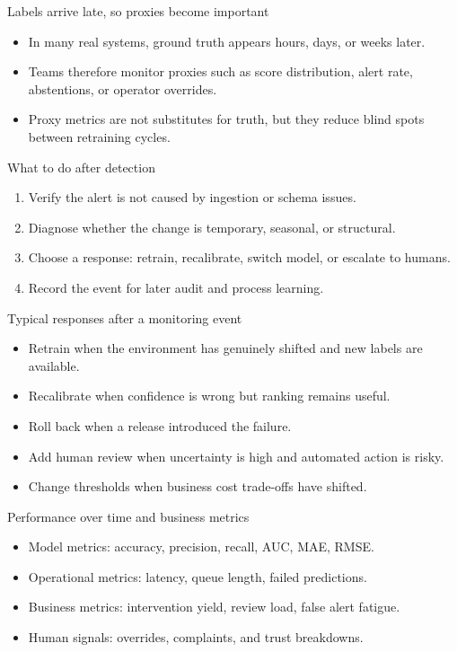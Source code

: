 \begin{frame}{Labels arrive late, so proxies become important}
\begin{itemize}
\item In many real systems, ground truth appears hours, days, or weeks later.
\item Teams therefore monitor proxies such as score distribution, alert rate, abstentions, or operator overrides.
\item Proxy metrics are not substitutes for truth, but they reduce blind spots between retraining cycles.
\end{itemize}
\coursefooter
\end{frame}

\begin{frame}{What to do after detection}
\begin{enumerate}
\item Verify the alert is not caused by ingestion or schema issues.
\item Diagnose whether the change is temporary, seasonal, or structural.
\item Choose a response: retrain, recalibrate, switch model, or escalate to humans.
\item Record the event for later audit and process learning.
\end{enumerate}
\coursefooter
\end{frame}

\begin{frame}{Typical responses after a monitoring event}
\begin{itemize}
\item Retrain when the environment has genuinely shifted and new labels are available.
\item Recalibrate when confidence is wrong but ranking remains useful.
\item Roll back when a release introduced the failure.
\item Add human review when uncertainty is high and automated action is risky.
\item Change thresholds when business cost trade-offs have shifted.
\end{itemize}
\coursefooter
\end{frame}

\begin{frame}{Performance over time and business metrics}
\begin{itemize}
\item Model metrics: accuracy, precision, recall, AUC, MAE, RMSE.
\item Operational metrics: latency, queue length, failed predictions.
\item Business metrics: intervention yield, review load, false alert fatigue.
\item Human signals: overrides, complaints, and trust breakdowns.
\end{itemize}
\coursefooter
\end{frame}

